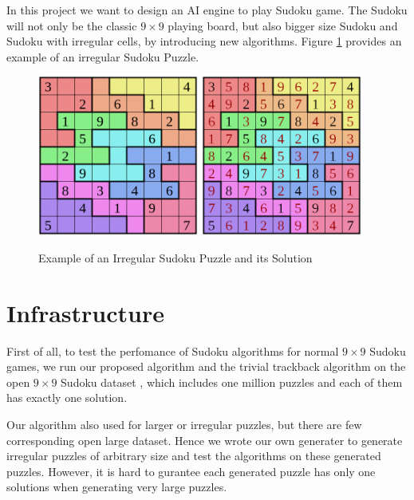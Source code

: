 \documentclass[12pt]{article}
\begin{document}
\begin{spacing}{1.1}
In this project we want to design an AI engine to play Sudoku game. The Sudoku will not only be the classic $ 9\times9 $ playing board, but also bigger size Sudoku and Sudoku with irregular cells, by introducing new algorithms. Figure \ref{FIg:IrregSudoku} provides an example of an irregular Sudoku Puzzle.
\begin{figure}[h]
	\label{FIg:IrregSudoku}
	\centering
	\includegraphics[width=150pt]{pic3.png}
	\hspace{30pt}
	\includegraphics[width=150pt]{pic4.png}
	\caption{Example of an Irregular Sudoku Puzzle and its Solution}
\end{figure}

\section{Infrastructure}
First of all, to test the perfomance of Sudoku algorithms for normal $9\times 9$ Sudoku games, we run our proposed algorithm and the trivial trackback algorithm on the open $9\times 9$ Sudoku dataset \cite{}, which includes one million puzzles and each of them has exactly one solution.

Our algorithm also used for larger or irregular puzzles, but there are few corresponding open large dataset. Hence we wrote our own generater to generate irregular puzzles of arbitrary size and test the algorithms on these generated puzzles. However, it is hard to gurantee each generated puzzle has only one solutions when generating very large puzzles.


\end{spacing}
\end{document}
